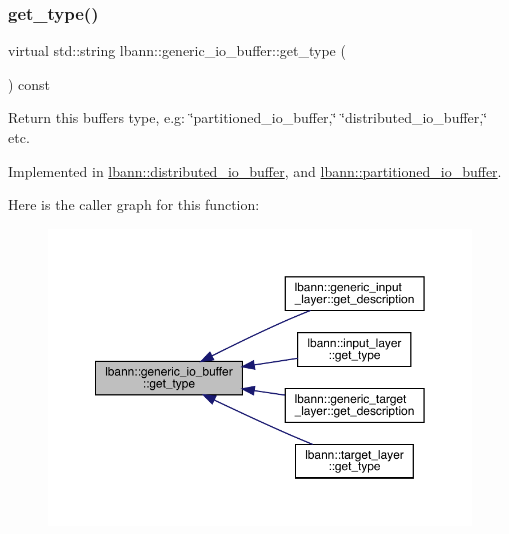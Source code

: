 \subsubsection{\texorpdfstring{get\+\_\+type()}{get\_type()}}
{\footnotesize\ttfamily virtual std\+::string lbann\+::generic\+\_\+io\+\_\+buffer\+::get\+\_\+type (\begin{DoxyParamCaption}{ }\end{DoxyParamCaption}) const\hspace{0.3cm}{\ttfamily [pure virtual]}}

Return this buffer\textquotesingle{}s type, e.\+g\+: \char`\"{}partitioned\+\_\+io\+\_\+buffer,\char`\"{} \char`\"{}distributed\+\_\+io\+\_\+buffer,\char`\"{} etc. 

Implemented in \hyperlink{classlbann_1_1distributed__io__buffer_a58e30ff6d96678b35b2470e1d292967c}{lbann\+::distributed\+\_\+io\+\_\+buffer}, and \hyperlink{classlbann_1_1partitioned__io__buffer_a55120307848cabf8ef12558594b4e9e5}{lbann\+::partitioned\+\_\+io\+\_\+buffer}.

Here is the caller graph for this function\+:\nopagebreak
\begin{figure}[H]
\begin{center}
\leavevmode
\includegraphics[width=350pt]{classlbann_1_1generic__io__buffer_adc77c0a280f8a200a8d8495c3a371ebb_icgraph}
\end{center}
\end{figure}
\mbox{\label{classlbann_1_1generic__io__buffer_a9a038d40aec50dbc24c0abe21ad0c0a9}} 
